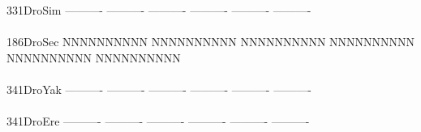 \documentclass[11pt,twoside,reqno,a4paper]{article}
\begin{document}
{331\hspace*{1\charwidth}DroSim	----------	----------	----------	----------	----------	----------	\\
\hspace*{4\charwidth}\hspace*{7\charwidth}\hspace*{1\charwidth}\hspace*{1\charwidth}\hspace*{1\charwidth}\hspace*{1\charwidth}\hspace*{1\charwidth}\hspace*{1\charwidth}\\
186\hspace*{1\charwidth}DroSec	NNNNNNNNNN	NNNNNNNNNN	NNNNNNNNNN	NNNNNNNNNN	NNNNNNNNNN	NNNNNNNNNN	\\
\hspace*{4\charwidth}\hspace*{7\charwidth}\hspace*{1\charwidth}\hspace*{1\charwidth}\hspace*{1\charwidth}\hspace*{1\charwidth}\hspace*{1\charwidth}\hspace*{1\charwidth}\\
341\hspace*{1\charwidth}DroYak	----------	----------	----------	----------	----------	----------	\\
\hspace*{4\charwidth}\hspace*{7\charwidth}\hspace*{1\charwidth}\hspace*{1\charwidth}\hspace*{1\charwidth}\hspace*{1\charwidth}\hspace*{1\charwidth}\hspace*{1\charwidth}\\
341\hspace*{1\charwidth}DroEre	----------	----------	----------	----------	----------	----------	\\
\hspace*{4\charwidth}\hspace*{7\charwidth}\hspace*{1\charwidth}\hspace*{1\charwidth}\hspace*{1\charwidth}\hspace*{1\charwidth}\hspace*{1\charwidth}\hspace*{1\charwidth}\\
}
\end{document}
